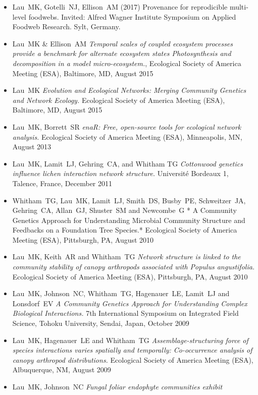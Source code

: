 \documentclass[a4paper]{article}
\begin{document}
\begin{itemize}
\item Lau~MK, Gotelli~NJ, Ellison~AM (2017) Provenance for
  reprodicible multi-level foodwebs. Invited: Alfred Wagner Institute
  Symposium on Applied Foodweb Research. Sylt, Germany. 
\item Lau~MK \& Ellison~AM \emph{Temporal scales of coupled ecosystem
  processes provide a benchmark for alternate ecosystem states
  Photosynthesis and decomposition in a model micro-ecosystem.},
  Ecological Society of America Meeting (ESA), Baltimore, MD, August
  2015
\item Lau~MK \emph{Evolution and Ecological Networks: Merging
  Community Genetics and Network Ecology.} Ecological Society of
  America Meeting (ESA), Baltimore, MD, August 2015
\item
  Lau~MK, Borrett~SR \emph{enaR: Free, open-source tools for ecological
  network analysis.} Ecological Society of America Meeting (ESA),
  Minneapolis, MN, August 2013
\item
  Lau~MK, Lamit~LJ, Gehring~CA, and Whitham TG \emph{Cottonwood genetics
  influence lichen interaction network structure.} Université Bordeaux
  1, Talence, France, December 2011
\item
  Whitham~TG, Lau~MK, Lamit~LJ, Smith~DS, Busby~PE, Schweitzer~JA,
  Gehring~CA, Allan~GJ, Shuster~SM and Newcombe~G * A Community Genetics
  Approach for Understanding Microbial Community Structure and Feedbacks
  on a Foundation Tree Species.* Ecological Society of America Meeting
  (ESA), Pittsburgh, PA, August 2010
\item
  Lau~MK, Keith~AR and Whitham~TG \emph{Network structure is linked to
  the community stability of canopy arthropods associated with Populus
  angustifolia.} Ecological Society of America Meeting (ESA),
  Pittsburgh, PA, August 2010
\item
  Lau~MK, Johnson~NC, Whitham~TG, Hagenauer~LE, Lamit~LJ and Lonsdorf~EV
  \emph{A Community Genetics Approach for Understanding Complex
  Biological Interactions.} 7th International Symposium on Integrated
  Field Science, Tohoku University, Sendai, Japan, October 2009
\item
  Lau~MK, Hagenauer~LE and Whitham~TG \emph{Assemblage-structuring force
  of species interactions varies spatially and temporally: Co-occurrence
  analysis of canopy arthropod distributions.} Ecological Society of
  America Meeting (ESA), Albuquerque, NM, August 2009
\item
  Lau~MK, Johnson~NC \emph{Fungal foliar endophyte communities exhibit
}
\end{itemize}
\end{document}
